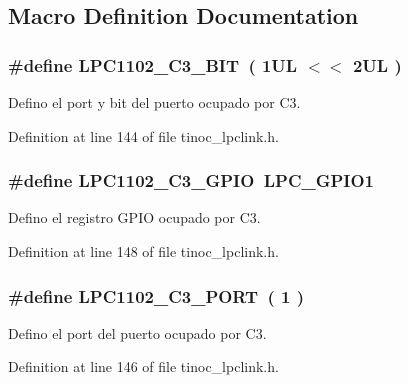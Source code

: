 \subsection{Macro Definition Documentation}
\subsubsection[{\texorpdfstring{L\+P\+C1102\+\_\+\+C3\+\_\+\+B\+IT}{LPC1102_C3_BIT}}]{\setlength{\rightskip}{0pt plus 5cm}\#define L\+P\+C1102\+\_\+\+C3\+\_\+\+B\+IT~( 1\+U\+L $<$$<$ 2\+U\+L )}\hypertarget{group___p_i_n_c3_ga9d9663e63d678743aeb834bbff7c7aed}{}\label{group___p_i_n_c3_ga9d9663e63d678743aeb834bbff7c7aed}


Defino el port y bit del puerto ocupado por C3. 



Definition at line 144 of file tinoc\+\_\+lpclink.\+h.

\subsubsection[{\texorpdfstring{L\+P\+C1102\+\_\+\+C3\+\_\+\+G\+P\+IO}{LPC1102_C3_GPIO}}]{\setlength{\rightskip}{0pt plus 5cm}\#define L\+P\+C1102\+\_\+\+C3\+\_\+\+G\+P\+IO~L\+P\+C\+\_\+\+G\+P\+I\+O1}\hypertarget{group___p_i_n_c3_gaee995322210bd5ce83ebe39b13dbd6bf}{}\label{group___p_i_n_c3_gaee995322210bd5ce83ebe39b13dbd6bf}


Defino el registro G\+P\+IO ocupado por C3. 



Definition at line 148 of file tinoc\+\_\+lpclink.\+h.

\subsubsection[{\texorpdfstring{L\+P\+C1102\+\_\+\+C3\+\_\+\+P\+O\+RT}{LPC1102_C3_PORT}}]{\setlength{\rightskip}{0pt plus 5cm}\#define L\+P\+C1102\+\_\+\+C3\+\_\+\+P\+O\+RT~( 1 )}\hypertarget{group___p_i_n_c3_ga7a5850ce0680199eef3742f80e5e8c85}{}\label{group___p_i_n_c3_ga7a5850ce0680199eef3742f80e5e8c85}


Defino el port del puerto ocupado por C3. 



Definition at line 146 of file tinoc\+\_\+lpclink.\+h.

